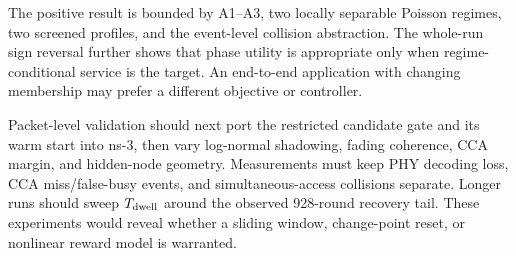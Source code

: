The positive result is bounded by A1--A3, two locally separable Poisson
regimes, two screened profiles, and the event-level collision abstraction.
The whole-run sign reversal further shows that phase utility is appropriate
only when regime-conditional service is the target. An end-to-end application
with changing membership may prefer a different objective or controller.

Packet-level validation should next port the restricted candidate gate and its
warm start into ns-3, then vary log-normal shadowing, fading coherence, CCA
margin, and hidden-node geometry. Measurements must keep PHY decoding loss,
CCA miss/false-busy events, and simultaneous-access collisions separate.
Longer runs should sweep $T_{\rm dwell}$ around the observed 928-round recovery
tail. These experiments would reveal whether a sliding window, change-point
reset, or nonlinear reward model is warranted.
